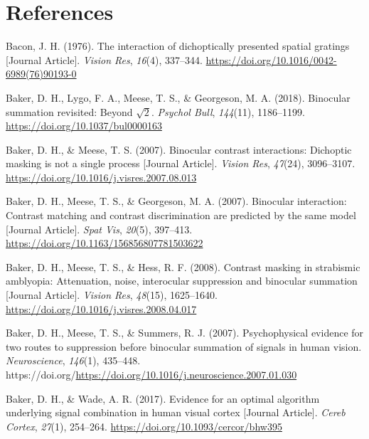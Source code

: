 \documentclass[
  12pt,
]{article}
\newlength{\cslhangindent}
\newenvironment{CSLReferences}[2] %
 {\begin{list}{}{%
  \setlength{\itemindent}{0pt}
  \setlength{\leftmargin}{0pt}
  \setlength{\parsep}{0pt}
  \ifodd #1
   \setlength{\leftmargin}{\cslhangindent}
   \setlength{\itemindent}{-1\cslhangindent}
  \fi
  \setlength{\itemsep}{#2\baselineskip}}}
 {\end{list}}
\begin{document}
\section*{References}\label{references}

\label{refs}
\begin{CSLReferences}{1}{0}
Bacon, J. H. (1976). The interaction of dichoptically presented spatial
gratings {[}Journal Article{]}. \emph{Vision Res}, \emph{16}(4),
337--344. \url{https://doi.org/10.1016/0042-6989(76)90193-0}

Baker, D. H., Lygo, F. A., Meese, T. S., \& Georgeson, M. A. (2018).
Binocular summation revisited: Beyond \(\sqrt{2}\). \emph{Psychol Bull},
\emph{144}(11), 1186--1199. \url{https://doi.org/10.1037/bul0000163}

Baker, D. H., \& Meese, T. S. (2007). Binocular contrast interactions:
Dichoptic masking is not a single process {[}Journal Article{]}.
\emph{Vision Res}, \emph{47}(24), 3096--3107.
\url{https://doi.org/10.1016/j.visres.2007.08.013}

Baker, D. H., Meese, T. S., \& Georgeson, M. A. (2007). Binocular
interaction: Contrast matching and contrast discrimination are predicted
by the same model {[}Journal Article{]}. \emph{Spat Vis}, \emph{20}(5),
397--413. \url{https://doi.org/10.1163/156856807781503622}

Baker, D. H., Meese, T. S., \& Hess, R. F. (2008). Contrast masking in
strabismic amblyopia: Attenuation, noise, interocular suppression and
binocular summation {[}Journal Article{]}. \emph{Vision Res},
\emph{48}(15), 1625--1640.
\url{https://doi.org/10.1016/j.visres.2008.04.017}

Baker, D. H., Meese, T. S., \& Summers, R. J. (2007). Psychophysical
evidence for two routes to suppression before binocular summation of
signals in human vision. \emph{Neuroscience}, \emph{146}(1), 435--448.
https://doi.org/\url{https://doi.org/10.1016/j.neuroscience.2007.01.030}

Baker, D. H., \& Wade, A. R. (2017). Evidence for an optimal algorithm
underlying signal combination in human visual cortex {[}Journal
Article{]}. \emph{Cereb Cortex}, \emph{27}(1), 254--264.
\url{https://doi.org/10.1093/cercor/bhw395}


\end{CSLReferences}
\end{document}
